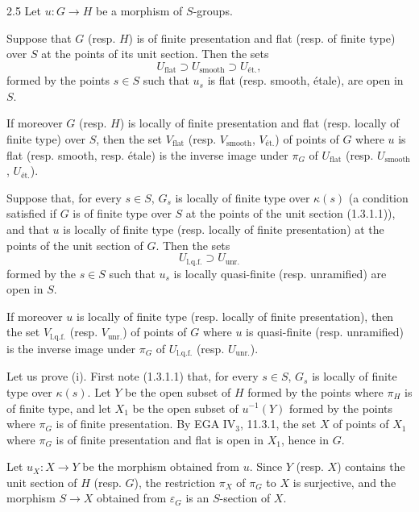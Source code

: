 \begin{proposition}{2.5}\label{VIB.2.5}
Let $u:G\to H$ be a morphism of $S$-groups.
\begin{enumeratei}
\item Suppose that $G$ (resp. $H$) is of finite presentation and flat (resp. of finite type) over $S$ at the points of its unit section. Then the sets
\[
U_{\mathrm{flat}}\supset U_{\mathrm{smooth}}\supset U_{\text{ét.}},
\]
formed by the points $s\in S$ such that $u_s$ is flat (resp. smooth, étale), are open in $S$.

If moreover $G$ (resp. $H$) is locally of finite presentation and flat (resp. locally of finite type) over $S$, then the set $V_{\mathrm{flat}}$ (resp. $V_{\mathrm{smooth}}$, $V_{\text{ét.}}$) of points of $G$ where $u$ is flat (resp. smooth, resp. étale) is the inverse image under $\pi_G$ of $U_{\mathrm{flat}}$ (resp. $U_{\mathrm{smooth}}$, $U_{\text{ét.}}$).
\item Suppose that, for every $s\in S$, $G_s$ is locally of finite type over $\kappa(s)$ (a condition satisfied if $G$ is of finite type over $S$ at the points of the unit section (1.3.1.1)), and that $u$ is locally of finite type (resp. locally of finite presentation) at the points of the unit section of $G$. Then the sets
\[
U_{\mathrm{l.q.f.}}\supset U_{\mathrm{unr.}}
\]
formed by the $s\in S$ such that $u_s$ is locally quasi-finite (resp. unramified) are open in $S$.

If moreover $u$ is locally of finite type (resp. locally of finite presentation), then the set $V_{\mathrm{l.q.f.}}$ (resp. $V_{\mathrm{unr.}}$) of points of $G$ where $u$ is quasi-finite (resp. unramified) is the inverse image under $\pi_G$ of $U_{\mathrm{l.q.f.}}$ (resp. $U_{\mathrm{unr.}}$).
\end{enumeratei}
\end{proposition}
Let us prove (i). First note (1.3.1.1) that, for every $s\in S$, $G_s$ is locally of finite type over $\kappa(s)$. Let $Y$ be the open subset of $H$ formed by the points where $\pi_H$ is of finite type, and let $X_1$ be the open subset of $u^{-1}(Y)$ formed by the points where $\pi_G$ is of finite presentation. By EGA IV$_3$, 11.3.1, the set $X$ of points of $X_1$ where $\pi_G$ is of finite presentation and flat is open in $X_1$, hence in $G$.

Let $u_X:X\to Y$ be the morphism obtained from $u$. Since $Y$ (resp. $X$) contains the unit section of $H$ (resp. $G$), the restriction $\pi_X$ of $\pi_G$ to $X$ is surjective, and the morphism $S\to X$ obtained from $\varepsilon_G$ is an $S$-section of $X$.

